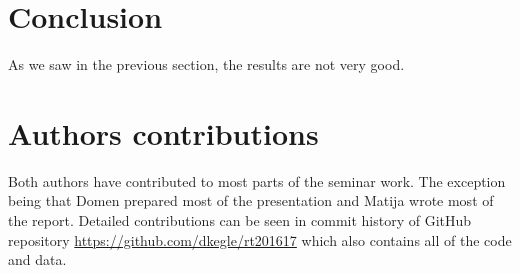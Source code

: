 \documentclass[12pt,a4paper]{amsart}
\begin{document}
\section{Conclusion}

As we saw in the previous section, the results are not very good.



\section{Authors contributions}
Both authors have contributed to most parts of the seminar work. The exception
being that Domen prepared most of the presentation and Matija wrote most of the
report. Detailed contributions can be seen in commit history of GitHub
repository \url{https://github.com/dkegle/rt201617} which also contains all of
the code and data.




\end{document}

